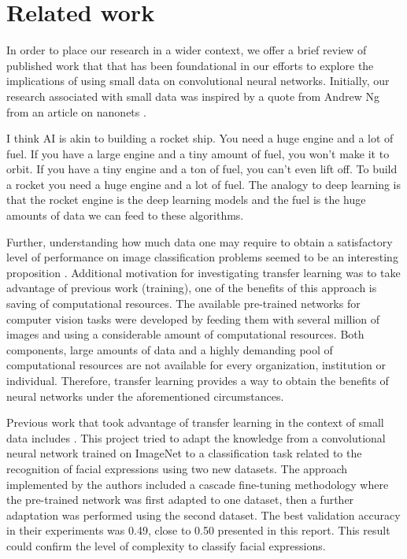 \documentclass{article}
\begin{document}
\section{Related work}
\label{sec:related}

In order to place our research in a wider context, we offer a brief review of published work that that has been foundational in our efforts to explore the implications of using small data on convolutional neural networks. Initially, our research associated with small data was inspired by a quote from Andrew Ng from an article on nanonets \cite{nanoNets}.

\begin{displayquote}
I think AI is akin to building a rocket ship. You need a huge engine and a lot of fuel. If you have a large engine and a tiny amount of fuel, you won’t make it to orbit. If you have a tiny engine and a ton of fuel, you can’t even lift off. To build a rocket you need a huge engine and a lot of fuel. The analogy to deep learning is that the rocket engine is the deep learning models and the fuel is the huge amounts of data we can feed to these algorithms.
\end{displayquote}

Further, understanding how much data one may require to obtain a satisfactory level of performance on image classification problems seemed to be an interesting proposition \cite{howMuchData}. Additional motivation for investigating transfer learning was to take advantage of previous work (training), one of the benefits of this approach is saving of computational resources. The available pre-trained networks for computer vision tasks were developed by feeding them with several million of images and using a considerable amount of computational resources. Both components, large amounts of data and a highly demanding pool of computational resources are not available for every organization, institution or individual. Therefore, transfer learning provides a way to obtain the benefits of neural networks under the aforementioned circumstances.

Previous work that took advantage of transfer learning in the context of small data includes \citep{ng2015deep}. This project tried to adapt the knowledge from a convolutional neural network trained on ImageNet to a classification task related to the recognition of facial expressions using two new datasets. The approach implemented by the authors included a cascade fine-tuning methodology where the pre-trained network was first adapted to one dataset, then a further adaptation was performed using the second dataset. The best validation accuracy in their experiments was 0.49, close to 0.50 presented in this report. This result could confirm the level of complexity to classify facial expressions.
\end{document}
